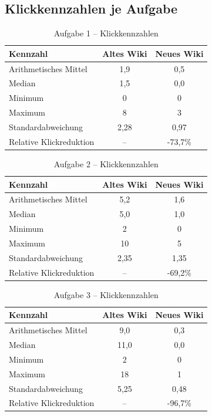 \newpage
\subsection{Klickkennzahlen je Aufgabe}

\begin{table}[H]
\centering
\caption{Aufgabe 1 -- Klickkennzahlen}
\label{tab:BB-task1-clicks}
\begin{tabular}{l c c}
\toprule
Kennzahl & Altes Wiki & Neues Wiki \\
\midrule
Arithmetisches Mittel & 1,9 & 0,5 \\
Median & 1,5 & 0,0 \\
Minimum & 0 & 0 \\
Maximum & 8 & 3 \\
Standardabweichung & 2,28 & 0,97 \\
Relative Klickreduktion & -- & -73,7\% \\
\bottomrule
\end{tabular}
\end{table}

\begin{table}[H]
\centering
\caption{Aufgabe 2 -- Klickkennzahlen}
\label{tab:BB-task2-clicks}
\begin{tabular}{l c c}
\toprule
Kennzahl & Altes Wiki & Neues Wiki \\
\midrule
Arithmetisches Mittel & 5,2 & 1,6 \\
Median & 5,0 & 1,0 \\
Minimum & 2 & 0 \\
Maximum & 10 & 5 \\
Standardabweichung & 2,35 & 1,35 \\
Relative Klickreduktion & -- & -69,2\% \\
\bottomrule
\end{tabular}
\end{table}

\begin{table}[H]
\centering
\caption{Aufgabe 3 -- Klickkennzahlen}
\label{tab:BB-task3-clicks}
\begin{tabular}{l c c}
\toprule
Kennzahl & Altes Wiki & Neues Wiki \\
\midrule
Arithmetisches Mittel & 9,0 & 0,3 \\
Median & 11,0 & 0,0 \\
Minimum & 2 & 0 \\
Maximum & 18 & 1 \\
Standardabweichung & 5,25 & 0,48 \\
Relative Klickreduktion & -- & -96,7\% \\
\bottomrule
\end{tabular}
\end{table}

